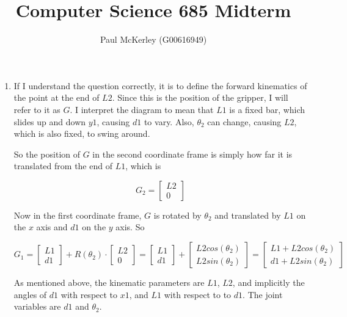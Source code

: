 \documentclass[letter,8pt]{article}
\begin{document}
\title{Computer Science 685 Midterm}
\author{Paul McKerley (G00616949)}
\selectfont
\frenchspacing

\maketitle 

\begin{enumerate} 

\item If I understand the question correctly, it is to define the
  forward kinematics of the point at the end of $L2$. Since this is
  the position of the gripper, I will refer to it as $G$. I interpret
  the diagram to mean that $L1$ is a fixed bar, which slides up and
  down $y1$, causing $d1$ to vary. Also, $\theta_2$ can change,
  causing $L2$, which is also fixed, to swing around.

  So the position of $G$ in the second coordinate frame is simply how
  far it is translated from the end of $L1$, which is

\[
    G_2 = 
    \begin{bmatrix}
        L2\\
        0
    \end{bmatrix} 
\]

  Now in the first coordinate frame, $G$ is rotated by $\theta_2$ and
  translated by $L1$ on the $x$ axis and $d1$ on the $y$ axis. So

  \[
  G_1 = \begin{bmatrix}
    L1\\
    d1
  \end{bmatrix} + R(\theta_2) \cdot     \begin{bmatrix}
        L2\\
        0
    \end{bmatrix}  = \begin{bmatrix}
    L1\\
    d1
  \end{bmatrix} + \begin{bmatrix}
    L2 cos(\theta_2)\\
    L2 sin(\theta_2)
  \end{bmatrix} = \begin{bmatrix}
    L1 + L2 cos(\theta_2)\\
    d1 + L2 sin(\theta_2)
  \end{bmatrix}
  \]

As mentioned above, the kinematic parameters are $L1$, $L2$, and
implicitly the angles of $d1$ with respect to $x1$, and $L1$ with
respect to to $d1$. The joint variables are $d1$ and $\theta_2$.


\end{enumerate}
\end{document}
